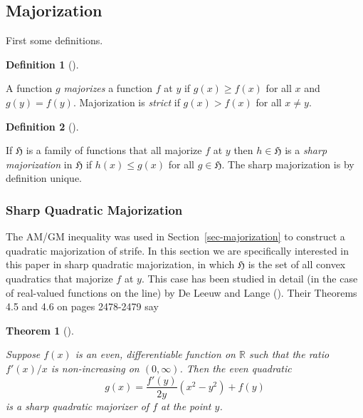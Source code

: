 \documentclass[
  12pt,
  letterpaper,
  DIV=11,
  numbers=noendperiod]{scrartcl}
\theoremstyle{plain}
\newtheorem{theorem}{Theorem}[section]
\theoremstyle{plain}
\theoremstyle{plain}
\theoremstyle{definition}
\newtheorem{definition}{Definition}[section]
\theoremstyle{remark}
\begin{document}
\subsection{Majorization}\label{majorization}

First some definitions.

\begin{definition}[]\protect\hypertarget{def-majorize}{}\label{def-majorize}

A function \(g\) \emph{majorizes} a function \(f\) at \(y\) if
\(g(x)\geq f(x)\) for all \(x\) and \(g(y)=f(y)\). Majorization is
\emph{strict} if \(g(x)>f(x)\) for all \(x\not= y\).

\end{definition}

\begin{definition}[]\protect\hypertarget{def-sharp}{}\label{def-sharp}

If \(\mathfrak{H}\) is a family of functions that all majorize \(f\) at
\(y\) then \(h\in\mathfrak{H}\) is a \emph{sharp majorization} in
\(\mathfrak{H}\) if \(h(x)\leq g(x)\) for all \(g\in\mathfrak{H}\). The
sharp majorization is by definition unique.

\end{definition}

\subsubsection{Sharp Quadratic
Majorization}\label{sharp-quadratic-majorization}

The AM/GM inequality was used in Section~\ref{sec-majorization} to
construct a quadratic majorization of strife. In this section we are
specifically interested in this paper in sharp quadratic majorization,
in which \(\mathfrak{H}\) is the set of all convex quadratics that
majorize \(f\) at \(y\). This case has been studied in detail (in the
case of real-valued functions on the line) by De Leeuw and Lange
(). Their Theorems 4.5 and 4.6 on
pages 2478-2479 say

\begin{theorem}[]\protect\hypertarget{thm-wght}{}\label{thm-wght}

Suppose \(f(x)\) is an even, differentiable function on \(\mathbb{R}\)
such that the ratio \(f'(x)/x\) is non-increasing on \((0,\infty)\).
Then the even quadratic \begin{equation}
g(x)=\frac{f'(y)}{2y}(x^2-y^2)+f(y)\label{eq:sharp}
\end{equation} is a sharp quadratic majorizer of \(f\) at the point
\(y\).

\end{theorem}
\end{document}
